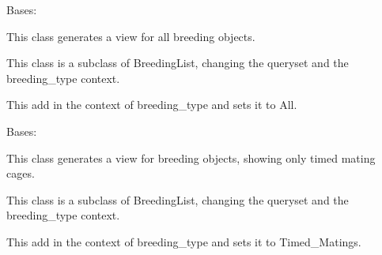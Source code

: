 \documentclass[letterpaper,10pt,english]{sphinxmanual}
\begin{document}

\begin{fulllineitems}
\label{api:mousedb.animal.views.BreedingListAll}
Bases: {\hyperref[api:mousedb.animal.views.BreedingList]{}}

This class generates a view for all breeding objects.

This class is a subclass of BreedingList, changing the queryset and the  breeding\_type context.


\begin{fulllineitems}
\label{api:mousedb.animal.views.BreedingListAll.get_context_data}
This add in the context of breeding\_type and sets it to All.

\end{fulllineitems}


\end{fulllineitems}



\begin{fulllineitems}
\label{api:mousedb.animal.views.BreedingListTimedMating}
Bases: {\hyperref[api:mousedb.animal.views.BreedingList]{}}

This class generates a view for breeding objects, showing only timed mating cages.

This class is a subclass of BreedingList, changing the queryset and the  breeding\_type context.


\begin{fulllineitems}
\label{api:mousedb.animal.views.BreedingListTimedMating.get_context_data}
This add in the context of breeding\_type and sets it to Timed\_Matings.

\end{fulllineitems}


\end{fulllineitems}
\end{document}
